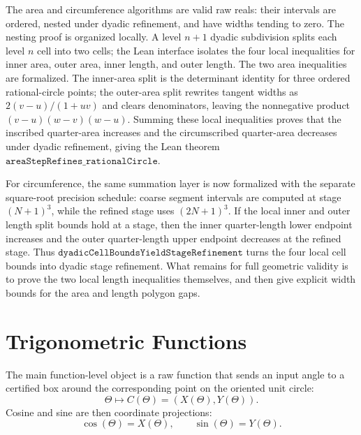 \begin{conjecture}
The area and circumference algorithms are valid raw reals: their intervals
are ordered, nested under dyadic refinement, and have widths tending to zero.
The nesting proof is organized locally.  A level \(n+1\) dyadic subdivision
splits each level \(n\) cell into two cells; the Lean interface isolates the
four local inequalities for inner area, outer area, inner length, and outer
length.  The two area inequalities are formalized.  The inner-area split is
the determinant identity for three ordered rational-circle points; the
outer-area split rewrites tangent widths as
\(2(v-u)/(1+uv)\) and clears denominators, leaving the nonnegative product
\((v-u)(w-v)(w-u)\).  Summing these local inequalities proves that the
inscribed quarter-area increases and the circumscribed quarter-area decreases
under dyadic refinement, giving the Lean theorem
\(\texttt{areaStepRefines\_rationalCircle}\).

For circumference, the same summation layer is now formalized with the
separate square-root precision schedule: coarse segment intervals are
computed at stage \((N+1)^3\), while the refined stage uses \((2N+1)^3\).
If the local inner and outer length split bounds hold at a stage, then the
inner quarter-length lower endpoint increases and the outer quarter-length
upper endpoint decreases at the refined stage.  Thus
\(\texttt{dyadicCellBoundsYieldStageRefinement}\) turns the four local cell
bounds into dyadic stage refinement.  What remains for full geometric
validity is to prove the two local length inequalities themselves, and then
give explicit width bounds for the area and length polygon gaps.
\end{conjecture}

\section{Trigonometric Functions}

The main function-level object is a raw function that sends an input angle to
a certified box around the corresponding point on the oriented unit circle:
\[
  \Theta \longmapsto C(\Theta)=(X(\Theta),Y(\Theta)).
\]
Cosine and sine are then coordinate projections:
\[
  \cos(\Theta)=X(\Theta),
  \qquad
  \sin(\Theta)=Y(\Theta).
\]

